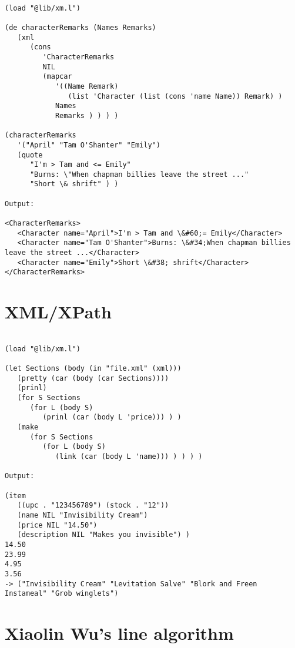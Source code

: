 \begin{verbatim}

(load "@lib/xm.l")

(de characterRemarks (Names Remarks)
   (xml
      (cons
         'CharacterRemarks
         NIL
         (mapcar
            '((Name Remark)
               (list 'Character (list (cons 'name Name)) Remark) )
            Names
            Remarks ) ) ) )

(characterRemarks
   '("April" "Tam O'Shanter" "Emily")
   (quote
      "I'm > Tam and <= Emily"
      "Burns: \"When chapman billies leave the street ..."
      "Short \& shrift" ) )

Output:

<CharacterRemarks>
   <Character name="April">I'm > Tam and \&#60;= Emily</Character>
   <Character name="Tam O'Shanter">Burns: \&#34;When chapman billies leave the street ...</Character>
   <Character name="Emily">Short \&#38; shrift</Character>
</CharacterRemarks>

\end{verbatim}

\section*{XML/XPath}

\begin{verbatim}

(load "@lib/xm.l")

(let Sections (body (in "file.xml" (xml)))
   (pretty (car (body (car Sections))))
   (prinl)
   (for S Sections
      (for L (body S)
         (prinl (car (body L 'price))) ) )
   (make
      (for S Sections
         (for L (body S)
            (link (car (body L 'name))) ) ) ) )

Output:

(item
   ((upc . "123456789") (stock . "12"))
   (name NIL "Invisibility Cream")
   (price NIL "14.50")
   (description NIL "Makes you invisible") )
14.50
23.99
4.95
3.56
-> ("Invisibility Cream" "Levitation Salve" "Blork and Freen Instameal" "Grob winglets")

\end{verbatim}

\section*{Xiaolin Wu's line algorithm}

